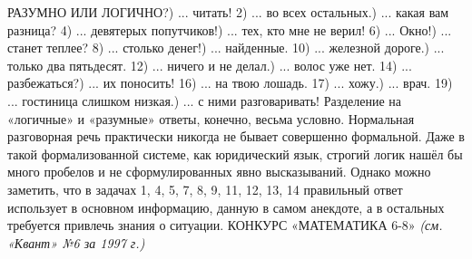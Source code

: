 \documentclass[10pt, a4paper, twoside]{article}
\begin{document}
\begin{multicols*}{2}
\noindent РАЗУМНО ИЛИ ЛОГИЧНО?) ... читать!   2) ... во всех остальных.) ... какая вам разница?  4) ... девятерых попутчиков!) ... тех, кто мне не верил!   6) ... Окно!) ... станет теплее?   8) ... столько денег!) ... найденные.   10) ... железной дороге.) ... только два пятьдесят.   12) ... ничего и не делал.) ... волос уже нет.   14) ... разбежаться?) ... их поносить!   16) ... на твою лошадь.   17) ... хожу.) ... врач.   19) ... гостиница слишком низкая.) ... с ними разговаривать!\newline
Разделение на «логичные» и «разумные» ответы, конечно, весьма условно. Нормальная разговорная речь практически никогда не бывает совершенно формальной. Даже в такой формализованной системе, как юридический язык, строгий логик нашёл бы много пробелов и не сформулированных явно высказываний. Однако можно заметить, что в задачах 1, 4, 5, 7, 8, 9, 11, 12, 13, 14 правильный ответ использует в основном информацию, данную в самом анекдоте, а в остальных требуется привлечь знания о ситуации.\newline
\newline
\newline
\noindent КОНКУРС «МАТЕМАТИКА 6-8»\newline
\textit{(см. «Квант» №6 за 1997 г.)}\newline

\end{multicols*}
\end{document}
